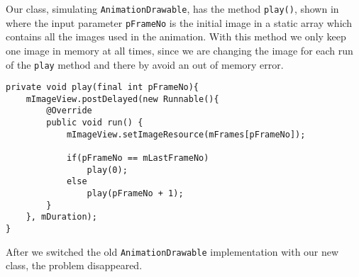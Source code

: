 Our class, simulating \lstinline{AnimationDrawable}, has the method \lstinline{play()}, shown in  where the input parameter \lstinline{pFrameNo} is the initial image in a static array which contains all the images used in the animation. 
With this method we only keep one image in memory at all times, since we are changing the image for each run of the \lstinline{play} method and there by avoid an out of memory error.
\begin{lstlisting}[caption={Our method for playing an animation based on a set of images.},label={lst:methodPlay}]
private void play(final int pFrameNo){
    mImageView.postDelayed(new Runnable(){
        @Override
        public void run() {                    
            mImageView.setImageResource(mFrames[pFrameNo]);

            if(pFrameNo == mLastFrameNo)
                play(0);
            else
                play(pFrameNo + 1);
        }
    }, mDuration);
}        
\end{lstlisting}

After we switched the old \lstinline{AnimationDrawable} implementation with our new class, the problem disappeared.